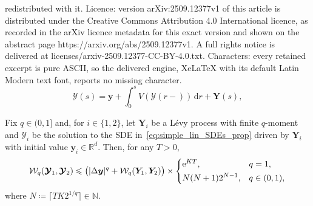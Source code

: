 \documentclass[10pt,a4paper]{amsart}
\newcommand\N{\mathbb{N}}
\newcommand\R{\mathbb{R}}
\newcommand\Y{\bm{\mathcal{Y}}}
\newcommand{\ceil}[1]{\lceil#1\rceil}
\newcommand\e{\mathord{\mathrm{e}}}
\renewcommand\le{\leqslant}
\newcommand{\mW}{\mathcal{W}}
\begin{document}
redistributed with it. Licence: version arXiv:2509.12377v1 of this article is distributed under the Creative Commons Attribution 4.0 International licence, as recorded in the arXiv licence metadata for this exact version and shown on the abstract page https://arxiv.org/abs/2509.12377v1. A full rights notice is delivered at licenses/arxiv-2509.12377-CC-BY-4.0.txt. Characters: every retained excerpt is pure ASCII, so the delivered engine, XeLaTeX with its default Latin Modern text font, reports no missing character.
\begin{equation}
\label{eq:simple_lin_SDEs_prop}
\Y(s) = \bm{y} + \int_0^s V(\Y(r-)) \, \mathrm{d}r + \bm{Y}(s),
\end{equation}

\begin{proposition}
\label{prop:simple_lin_SDE_gen_bound} 
Fix $q \in (0,1]$ and, for $i\in\{1,2\}$, let $\bm{Y}_i$ be a L\'evy process with finite $q$-moment and $\Y_i$ be the solution to the SDE in~\eqref{eq:simple_lin_SDEs_prop} driven by $\bm{Y}_i$ with initial value $\bm{y}_i\in\R^d$. Then, for any $T>0$,
\begin{equation*}
\mW_q(\Y_1,\Y_2) 
\le \big(|\Delta\bm{y}|^q +\mW_{q}(\bm{Y}_1,\bm{Y}_2) \big)
\times\begin{dcases}
\e^{KT}, & q=1,\\
 N(N+1) 2^{N-1}, & q \in (0,1),
\end{dcases}
\end{equation*}
where $N \coloneqq \ceil{TK2^{1/q}} \in \N$.
\end{proposition}
\end{document}
